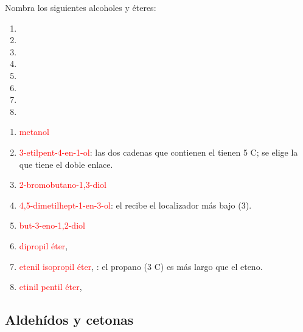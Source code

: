 \begin{exercise}
    Nombra los siguientes alcoholes y éteres:
    \begin{enumerate}[label=\alph*)]
        \item {}
        \item {}
        \item {}
        \item {}
        \item {}
        \item {}
        \item {}
        \item {}
    \end{enumerate}
    \begin{solu}
        \begin{enumerate}[label=\alph*)]
            \item \textcolor{red}{metanol}
            \item \textcolor{red}{3-etilpent-4-en-1-ol}: las dos cadenas que contienen el  tienen 5 C; se elige la que tiene el doble enlace.
            \item \textcolor{red}{2-bromobutano-1,3-diol}
            \item \textcolor{red}{4,5-dimetilhept-1-en-3-ol}: el  recibe el localizador más bajo (3).
            \item \textcolor{red}{but-3-eno-1,2-diol}
            \item \textcolor{red}{dipropil éter}, 
            \item \textcolor{red}{etenil isopropil éter}, : el propano (3 C) es más largo que el eteno.
            \item \textcolor{red}{etinil pentil éter}, 
        \end{enumerate}
    \end{solu}
\end{exercise}

\subsection*{Aldehídos y cetonas}

